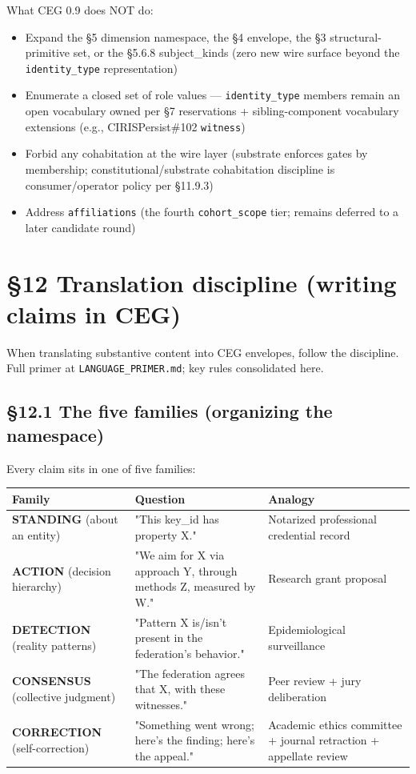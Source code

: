 \documentclass[11pt]{article}
\begin{document}
What CEG 0.9 does NOT do:

\begin{itemize}\setlength\itemsep{0pt}
\item Expand the §5 dimension namespace, the §4 envelope, the §3 structural-primitive set, or the §5.6.8 subject\_kinds (zero new wire surface beyond the \texttt{identity\_type} representation)
\item Enumerate a closed set of role values — \texttt{identity\_type} members remain an open vocabulary owned per §7 reservations + sibling-component vocabulary extensions (e.g., CIRISPersist\#102 \texttt{witness})
\item Forbid any cohabitation at the wire layer (substrate enforces gates by membership; constitutional/substrate cohabitation discipline is consumer/operator policy per §11.9.3)
\item Address \texttt{affiliations} (the fourth \texttt{cohort\_scope} tier; remains deferred to a later candidate round)
\end{itemize}




\clearpage


\section*{§12 Translation discipline (writing claims in CEG)}


When translating substantive content into CEG envelopes, follow the discipline. Full primer at \texttt{LANGUAGE\_PRIMER.md}; key rules consolidated here.


\subsection*{§12.1 The five families (organizing the namespace)}


Every claim sits in one of five families:


{\footnotesize
\begin{longtable}{|p{5.33cm}|p{5.33cm}|p{5.33cm}|}\hline
\textbf{Family} & \textbf{Question} & \textbf{Analogy} \\ \hline\endhead
\textbf{STANDING} (about an entity) & "This key\_id has property X." & Notarized professional credential record \\ \hline
\textbf{ACTION} (decision hierarchy) & "We aim for X via approach Y, through methods Z, measured by W." & Research grant proposal \\ \hline
\textbf{DETECTION} (reality patterns) & "Pattern X is/isn't present in the federation's behavior." & Epidemiological surveillance \\ \hline
\textbf{CONSENSUS} (collective judgment) & "The federation agrees that X, with these witnesses." & Peer review + jury deliberation \\ \hline
\textbf{CORRECTION} (self-correction) & "Something went wrong; here's the finding; here's the appeal." & Academic ethics committee + journal retraction + appellate review \\ \hline
\end{longtable}}
\end{document}
